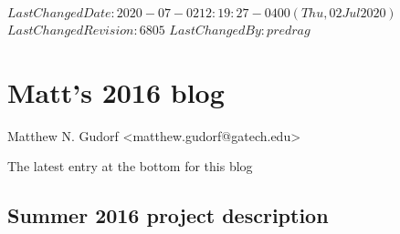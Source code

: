 {$LastChangedDate: 2020-07-02 12:19:27 -0400 (Thu, 02 Jul 2020) $}
{$LastChangedRevision: 6805 $} {$LastChangedBy: predrag $}

\chapter{Matt's 2016 blog}
\label{chap:blogMNG16}

\bigskip

\hfill {\large Matthew N. Gudorf <matthew.gudorf@gatech.edu>}

\hfill   {\color{red} The latest entry at the bottom for this blog}

\section{Summer 2016 project description}
\label{s:summer16}


